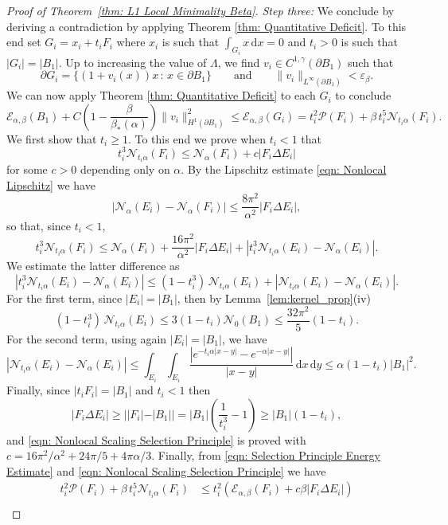 \documentclass[a4paper,11pt,reqno]{amsart}
\numberwithin{equation}{section}
\theoremstyle{remark}
\theoremstyle{definition}
\let\epsilon\varepsilon
\newcommand{\dd}{\,\mathrm{d}}
\newcommand{\ene}{\mathcal{E}_{\alpha,\beta}}
\newcommand{\nl}{\mathcal{N}_{\alpha}}
\renewcommand{\leq}{\leqslant}
\renewcommand{\geq}{\geqslant}
\newcommand{\calN}{\mathcal{N}}
\newcommand{\Pe}{\mathcal{P}}
\begin{document}
\begin{proof}[Proof of Theorem~\ref{thm: L1 Local Minimality Beta}]
\textit{Step three:} We conclude by deriving a contradiction by applying Theorem \ref{thm: Quantitative Deficit}. To this end set $G_i = x_i+t_iF_i$ where $x_i$ is such that $\int_{G_i} x \dd x = 0$ and $t_i>0$ is such that $|G_i|=|B_1|$. Up to increasing the value of $\Lambda$, we find $v_i \in C^{1,\gamma}(\partial B_1)$ such that
	\[
		\partial G_i = \Big\lbrace(1+v_i(x))x \, : \, x\in \partial B_1\Big\rbrace \qquad \text{and} \qquad \|v_i\|_{L^{\infty}(\partial B_1)} < \epsilon_{\beta}.
	\]
We can now apply Theorem \ref{thm: Quantitative Deficit} to each $G_i$ to conclude
	\begin{equation}\label{eqn: Selection Principle Contradiction Estimate}
		\ene(B_1)+C\left(1-\frac{\beta}{\beta_*(\alpha)}\right)\|v_i\|_{H^1(\partial B_1)}^2 \leq \ene(G_i) = t_i^2\Pe(F_i) + \beta\,t_i^5 \calN_{t_i\alpha}(F_i).	
	\end{equation}
We first show that $t_i\geq 1$. To this end we prove when $t_i<1$ that
	\begin{equation}\label{eqn: Nonlocal Scaling Selection Principle}
		t_i^3\calN_{t_i\alpha}(F_i) \leq \nl(F_i)+c|F_i\Delta E_i|
	\end{equation}
for some $c>0$ depending only on $\alpha$. By the Lipschitz estimate \eqref{eqn: Nonlocal Lipschitz} we have 
	\[
		|\nl(E_i)-\nl(F_i)| \leq \frac{8\pi^2}{\alpha^2}|F_i\Delta E_i|,
	\]
so that, since $t_i< 1$, 
	\[
		t_i^3\calN_{t_i\alpha}(F_i) \leq \nl(F_i)+ \frac{16\pi^2}{\alpha^2}|F_i\Delta E_i|+|t_i^3\calN_{t_i\alpha}(E_i)-\nl(E_i)| .
	\]
We estimate the latter difference as 
	\[
		|t_i^3\calN_{t_i\alpha}(E_i)-\nl(E_i)| \leq (1-t_i^3)\,\calN_{t_i\alpha}(E_i)+|\calN_{t_i\alpha}(E_i)-\nl(E_i)|.
	\]
For the first term, since $|E_i|=|B_1|$, then by Lemma~\ref{lem:kernel_prop}(iv)
	\[
		(1-t_i^3)\,\calN_{t_i\alpha}(E_i) \leq 3(1-t_i)\calN_0(B_1) \leq \frac{32\pi^2}{5}(1-t_i).
	\]
For the second term, using again $|E_i|=|B_1|$, we have
	\[
		|\calN_{t_i\alpha}(E_i)-\nl(E_i)| \leq \int_{E_i}\int_{E_i} \frac{|e^{-t_i\alpha|x-y|}-e^{-\alpha|x-y|}|}{|x-y|} \dd x \dd y \leq \alpha(1-t_i)|B_1|^2.
	\]
Finally, since $|t_iF_i|=|B_1|$ and $t_i< 1$ then 
	\[
	|F_i\Delta E_i|\geq ||F_i|-|B_1||=|B_1|\left(\frac{1}{t_i^3}-1\right) \geq  |B_1|(1-t_i),
	\]
and \eqref{eqn: Nonlocal Scaling Selection Principle} is proved with $c=16\pi^2/\alpha^2+24\pi/5+4\pi\alpha/3$. Finally, from \eqref{eqn: Selection Principle Energy Estimate} and \eqref{eqn: Nonlocal Scaling Selection Principle} we have
	\begin{align*}
		t_i^2\Pe(F_i) + \beta\, t_i^5\calN_{t_i\alpha}(F_i)  &\leq t_i^2\left(\ene(F_i) + c\beta|F_i\Delta E_i|\right) \\

\end{align*}
\end{proof}
\end{document}
